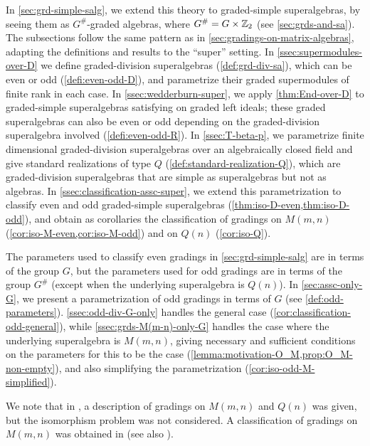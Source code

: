 In \cref{sec:grd-simple-salg}, we extend this theory to graded-simple superalgebras, by seeing them as $G^\#$-graded algebras, where $G^\# = G \times \mathbb{Z}_2$ (see \cref{sec:grds-and-sa}). 
The subsections follow the same pattern as in \cref{sec:gradings-on-matrix-algebras}, adapting the definitions and results to the ``super'' setting. 
In \cref{ssec:supermodules-over-D} we define graded-division superalgebras (\cref{def:grd-div-sa}), which can be even or odd (\cref{defi:even-odd-D}), and parametrize their graded supermodules of finite rank in each case. 
In \cref{ssec:wedderburn-super}, we apply \cref{thm:End-over-D} to graded-simple superalgebras satisfying \dcc on graded left ideals; these graded superalgebras can also be even or odd depending on the graded-division superalgebra involved (\cref{defi:even-odd-R}). 
In \cref{ssec:T-beta-p}, we parametrize finite dimensional graded-division superalgebras over an algebraically closed field and give standard realizations of type $Q$ (\cref{def:standard-realization-Q}), which are graded-division superalgebras that are simple as superalgebras but not as algebras. 
In \cref{ssec:classification-assc-super}, we extend this parametrization to classify even and odd graded-simple superalgebras (\cref{thm:iso-D-even,thm:iso-D-odd}), and obtain as corollaries the classification of gradings on $M(m,n)$ (\cref{cor:iso-M-even,cor:iso-M-odd}) and on $Q(n)$ (\cref{cor:iso-Q}).

The parameters used to classify even gradings in \cref{sec:grd-simple-salg} are in terms of the group $G$, but the parameters used for odd gradings are in terms of the group $G^\#$ (except when the underlying superalgebra is $Q(n)$). 
In \cref{sec:assc-only-G}, we present a parametrization of odd gradings in terms of $G$ (see \cref{def:odd-parameters}). 
\cref{ssec:odd-div-G-only} handles the general case (\cref{cor:classification-odd-general}), while \cref{ssec:grds-M(m-n)-only-G} handles the case where the underlying superalgebra is $M(m,n)$, giving necessary and sufficient conditions on the parameters for this to be the case (\cref{lemma:motivation-O_M,prop:O_M-non-empty}), and also simplifying the parametrization (\cref{cor:iso-odd-M-simplified}). 

We note that in \cite{BS}, a description of gradings on $M(m,n)$ and $Q(n)$ was given, but the isomorphism problem was not considered. 
A classification of gradings on $M(m,n)$ was obtained in \cite{paper-MAP} (see also \cite{Helens_thesis}). 



